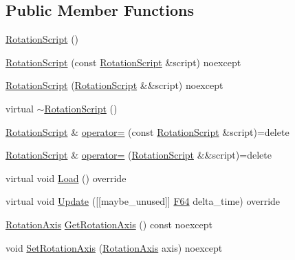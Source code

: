 \subsection*{Public Member Functions}
\begin{DoxyCompactItemize}
\item 
\hyperlink{classmage_1_1script_1_1_rotation_script_a2961e96c890f5b737fa1851a4f6434fe}{Rotation\+Script} ()
\item 
\hyperlink{classmage_1_1script_1_1_rotation_script_adac08b8383fabba67df915f03a2a01ee}{Rotation\+Script} (const \hyperlink{classmage_1_1script_1_1_rotation_script}{Rotation\+Script} \&script) noexcept
\item 
\hyperlink{classmage_1_1script_1_1_rotation_script_a56942de038a4899fa2fb3d9199f18052}{Rotation\+Script} (\hyperlink{classmage_1_1script_1_1_rotation_script}{Rotation\+Script} \&\&script) noexcept
\item 
virtual \hyperlink{classmage_1_1script_1_1_rotation_script_a7deb74070c49b78b0b91e3599ee8a0b7}{$\sim$\+Rotation\+Script} ()
\item 
\hyperlink{classmage_1_1script_1_1_rotation_script}{Rotation\+Script} \& \hyperlink{classmage_1_1script_1_1_rotation_script_afa4e9fcddf4f20f6c471dfd5fed1610f}{operator=} (const \hyperlink{classmage_1_1script_1_1_rotation_script}{Rotation\+Script} \&script)=delete
\item 
\hyperlink{classmage_1_1script_1_1_rotation_script}{Rotation\+Script} \& \hyperlink{classmage_1_1script_1_1_rotation_script_a72642ac8b1f210ab4eb7feb67238a1bb}{operator=} (\hyperlink{classmage_1_1script_1_1_rotation_script}{Rotation\+Script} \&\&script)=delete
\item 
virtual void \hyperlink{classmage_1_1script_1_1_rotation_script_a7a632d323f57f4f2f19c0562bd0656e1}{Load} () override
\item 
virtual void \hyperlink{classmage_1_1script_1_1_rotation_script_a868768482599b478e8fd8afe371b6c54}{Update} (\mbox{[}\mbox{[}maybe\+\_\+unused\mbox{]}\mbox{]} \hyperlink{namespacemage_ad26233bbec640deda836e572c1a23708}{F64} delta\+\_\+time) override
\item 
\hyperlink{classmage_1_1script_1_1_rotation_script_aa8a91cc8c771fc777ffb5e8a28c43ad2}{Rotation\+Axis} \hyperlink{classmage_1_1script_1_1_rotation_script_ac2ef46249d59b379f47336eb250f3a28}{Get\+Rotation\+Axis} () const noexcept
\item 
void \hyperlink{classmage_1_1script_1_1_rotation_script_aa4b49dc5e34da3e851d5aefc4c4a434b}{Set\+Rotation\+Axis} (\hyperlink{classmage_1_1script_1_1_rotation_script_aa8a91cc8c771fc777ffb5e8a28c43ad2}{Rotation\+Axis} axis) noexcept
\end{DoxyCompactItemize}
